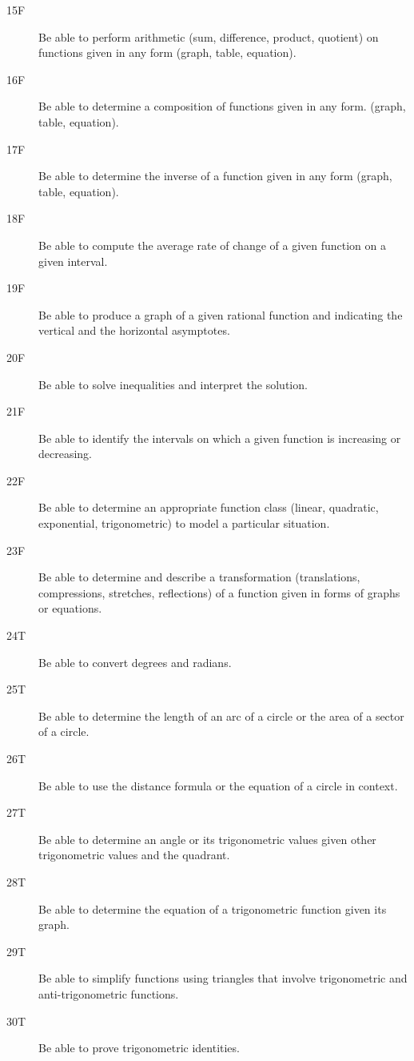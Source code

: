 \documentclass[10pt,]{article}
\theoremstyle{plain}
\theoremstyle{definition}
\numberwithin{equation}{section}
\begin{document}
\begin{description}
\item[{15F}]\hypertarget{li-15}{}\hypertarget{p-16}{}%
Be able to perform arithmetic (sum, difference, product, quotient) on functions given in any form (graph, table, equation).%
\item[{16F}]\hypertarget{li-16}{}\hypertarget{p-17}{}%
Be able to determine a composition of functions given in any form. (graph, table, equation).%
\item[{17F}]\hypertarget{li-17}{}\hypertarget{p-18}{}%
Be able to determine the inverse of a function given in any form (graph, table, equation).%
\item[{18F}]\hypertarget{li-18}{}\hypertarget{p-19}{}%
Be able to compute the average rate of change of a given function on a given interval.%
\item[{19F}]\hypertarget{li-19}{}\hypertarget{p-20}{}%
Be able to produce a graph of a given rational function and indicating the vertical and the horizontal asymptotes.%
\item[{20F}]\hypertarget{li-20}{}\hypertarget{p-21}{}%
Be able to solve inequalities and interpret the solution.%
\item[{21F}]\hypertarget{li-21}{}\hypertarget{p-22}{}%
Be able to identify the intervals on which a given function is increasing or decreasing.%
\item[{22F}]\hypertarget{li-22}{}\hypertarget{p-23}{}%
Be able to determine an appropriate function class (linear, quadratic, exponential, trigonometric) to model a particular situation.%
\item[{23F}]\hypertarget{li-23}{}\hypertarget{p-24}{}%
Be able to determine and describe a transformation (translations, compressions, stretches, reflections) of a function given in forms of graphs or equations.%
\item[{24T}]\hypertarget{li-24}{}\hypertarget{p-25}{}%
Be able to convert degrees and radians.%
\item[{25T}]\hypertarget{li-25}{}\hypertarget{p-26}{}%
Be able to determine the length of an arc of a circle or the area of a sector of a circle.%
\item[{26T}]\hypertarget{li-26}{}\hypertarget{p-27}{}%
Be able to use the distance formula or the equation of a circle in context.%
\item[{27T}]\hypertarget{li-27}{}\hypertarget{p-28}{}%
Be able to determine an angle or its trigonometric values given other trigonometric values and the quadrant.%
\item[{28T}]\hypertarget{li-28}{}\hypertarget{p-29}{}%
Be able to determine the equation of a trigonometric function given its graph.%
\item[{29T}]\hypertarget{li-29}{}\hypertarget{p-30}{}%
Be able to simplify functions using triangles that involve trigonometric and anti-trigonometric functions.%
\item[{30T}]\hypertarget{li-30}{}\hypertarget{p-31}{}%
Be able to prove trigonometric identities.%
\end{description}
\typeout{************************************************}
\typeout{************************************************}
\end{document}
